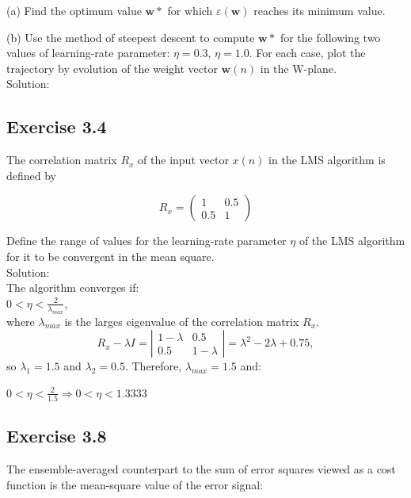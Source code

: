 \documentclass[a4paper, 12pt]{article}
\begin{document}
(a) Find the optimum value $\boldsymbol{w}*$ for which $\varepsilon(\boldsymbol{w})$ reaches its minimum value.

(b) Use the method of steepest descent to compute $\boldsymbol{w}*$ for the following two values of learning-rate parameter: $\eta = 0.3$, $\eta = 1.0$. For each case, plot the trajectory by evolution of the weight vector $\boldsymbol{w}(n)$ in the W-plane.\\

Solution:\\


\subsection{Exercise 3.4}
The correlation matrix $R_x$ of the input vector $x(n)$ in the LMS algorithm is defined by

\[ R_x = \left( \begin{array}{ccc}
1 & 0.5 \\
0.5  & 1 \end{array} \right)\]

Define the range of values for the learning-rate parameter $\eta$ of the LMS algorithm for it to be convergent in the mean square.\\

Solution:\\

The algorithm converges if:\\

$0 < \eta < \frac{2}{\lambda_{max}}$,\\
where $\lambda_{max}$ is the larges eigenvalue of the correlation matrix $R_x$.\\

 \[ R_x - \lambda I = \left| \begin{array}{ccc}
1 - \lambda & 0.5 \\
0.5 & 1 - \lambda \end{array} \right| = \lambda^2 - 2\lambda + 0.75,\]
so $\lambda_1 = 1.5$ and $\lambda_2 = 0.5$. Therefore, $\lambda_{max} = 1.5$ and:

$0 < \eta < \frac{2}{1.5} \Rightarrow 0 < \eta < 1.3333$

\subsection{Exercise 3.8}
The ensemble-averaged counterpart to the sum of error squares viewed as a cost function is the mean-square value
of the error signal:
\end{document}
